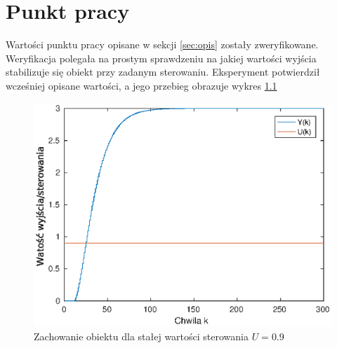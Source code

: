 \chapter{Punkt pracy}
Wartości punktu pracy opisane w sekcji \ref{sec:opis} zostały
zweryfikowane. Weryfikacja polegała na prostym sprawdzeniu na jakiej
wartości wyjścia stabilizuje się obiekt przy zadanym sterowaniu.
Eksperyment potwierdził wcześniej opisane wartości, a jego przebieg
obrazuje wykres \ref{fig:pkt_prac}
\begin{figure}
  \includegraphics{wykresy/1.eps}
  \caption{Zachowanie obiektu dla stałej wartości sterowania $U = 0.9$}
  \label{fig:pkt_prac}
\end{figure}

